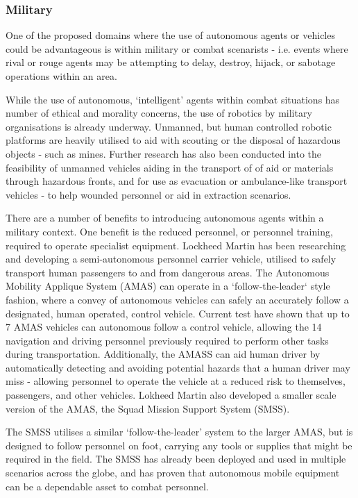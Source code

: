 \subsubsection{Military}
One of the proposed domains where the use of autonomous agents or vehicles
could be advantageous is within military or combat scenarists - i.e. events
where rival or rouge agents may be attempting to delay, destroy, hijack, or
sabotage operations within an area.

While the use of autonomous, `intelligent' agents within combat situations
has number of ethical and morality concerns, the use of robotics by military
organisations is already underway.
Unmanned, but human controlled robotic platforms are heavily utilised to aid
with scouting or the disposal of hazardous objects - such as mines.
Further research has also been conducted into the feasibility of unmanned
vehicles aiding in the transport of of aid or materials through hazardous
fronts, and for use as evacuation or ambulance-like transport vehicles - to
help wounded personnel or aid in extraction scenarios.

There are a number of benefits to introducing autonomous agents within a
military context.  
One benefit is the reduced personnel, or personnel training, required to
operate specialist equipment.  
Lockheed Martin has been researching and developing a semi-autonomous
personnel carrier vehicle, utilised to safely transport human passengers to
and from dangerous areas.
The Autonomous Mobility Applique System (AMAS) can operate in a
`follow-the-leader` style fashion, where a convey of autonomous vehicles can
safely an accurately follow a designated, human operated, control vehicle.
Current test have shown that up to 7 AMAS vehicles can autonomous follow a
control vehicle, allowing the 14 navigation and driving personnel previously
required to perform other tasks during transportation.
Additionally, the AMASS can aid human driver by automatically detecting and
avoiding potential hazards that a human driver may miss - allowing personnel to operate
the vehicle at a reduced risk to themselves, passengers, and other vehicles.
Lokheed Martin also developed a smaller scale version of the AMAS, the Squad Mission
Support System (SMSS).

The SMSS utilises a similar `follow-the-leader' system to the larger AMAS, but
is designed to follow personnel on foot, carrying any tools or supplies that
might be required in the field.
The SMSS has already been deployed and used in multiple scenarios across the
globe, and has proven that autonomous mobile equipment can be a dependable
asset to combat personnel.

